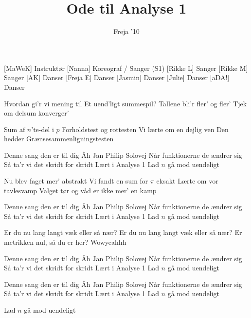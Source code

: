\documentclass[a4paper,11pt]{article}
\title{Ode til Analyse 1}
\author{Freja '10}
\begin{document}
\maketitle

\begin{roles}
[MaWeK] Instruktør
[Nanna] Koreograf / Sanger (S1)
[Rikke L] Sanger
[Rikke M] Sanger
[AK] Danser
[Freja E] Danser
[Jasmin] Danser
[Julie] Danser
[aDA!] Danser
\end{roles}

\begin{song}
 Hvordan gi'r vi mening til
Et uend'ligt summespil?
Tallene bli'r fler' og fler'
Tjek om delsum konverger'

 Sum af $n$'te-del i $p$
Forholdstest og rottesten
Vi lærte om en dejlig ven
 Den hedder Grænsesammenligningstesten

 Denne sang den er til dig
Åh Jan Philip Solovej
Når funktionerne de ændrer sig
Så ta'r vi det skridt for skridt
Lært i Analyse 1
Lad $n$ gå mod uendeligt

 Nu blev faget mer' abstrakt
Vi fandt en sum for $\pi$ eksakt
Lærte om vor tavlesvamp
 Valget tør og våd er ikke mer' en kamp

 Denne sang den er til dig
Åh Jan Philip Solovej
Når funktionerne de ændrer sig
Så ta'r vi det skridt for skridt
Lært i Analyse 1
Lad $n$ gå mod uendeligt

 Er du nu lang langt væk eller så nær?
 Er du nu lang langt væk eller så nær?
 Er metrikken nul, så du er her?
 Wowyeahhh

 Denne sang den er til dig
Åh Jan Philip Solovej
Når funktionerne de ændrer sig
Så ta'r vi det skridt for skridt
Lært i Analyse 1
Lad $n$ gå mod uendeligt

 Denne sang den er til dig
Åh Jan Philip Solovej
Når funktionerne de ændrer sig
Så ta'r vi det skridt for skridt
Lært i Analyse 1
Lad $n$ gå mod uendeligt

 Lad $n$ gå mod uendeligt
\end{song}
\end{document}
